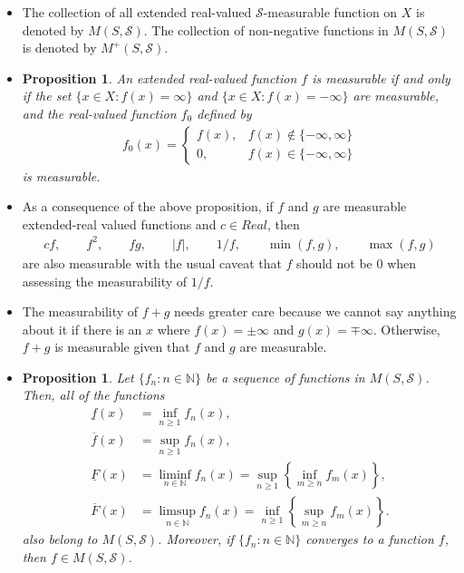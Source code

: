 \documentclass[10pt]{article}
\newtheorem{proposition}[lemma]{Proposition}
\newcommand{\mcal}[1]{\mathcal{#1}}
\begin{document}
\begin{itemize}
  \item The collection of all extended real-valued $\mcal{S}$-measurable function on $X$ is denoted by $M(S,\mcal{S})$. The collection of non-negative functions in $M(S, \mcal{S})$ is denoted by $M^+(S,\mcal{S})$.
  
  \item \begin{proposition}
    An extended real-valued function $f$ is measurable if and only if the set $\{ x \in X : f(x) = \infty\}$ and $\{ x \in X : f(x) = -\infty\}$ are measurable, and the real-valued function $f_0$ defined by
    \begin{align*}
      f_0(x) = \begin{cases}
        f(x), & f(x) \not\in \{-\infty,\infty\} \\
        0, & f(x) \in \{-\infty,\infty\}
      \end{cases}
    \end{align*}
    is measurable.
  \end{proposition}

  \item As a consequence of the above proposition, if $f$ and $g$ are measurable extended-real valued functions and $c \in Real$, then
  \begin{align*}
    cf, \qquad f^2, \qquad fg, \qquad |f|, \qquad 1/f, \qquad \min(f,g), \qquad \max(f,g)
  \end{align*}
  are also measurable with the usual caveat that $f$ should not be $0$ when assessing the measurability of $1/f$.

  \item The measurability of $f+g$ needs greater care because we cannot say anything about it if there is an $x$ where $f(x) = \pm\infty$ and $g(x) = \mp\infty$. Otherwise, $f+g$ is measurable given that $f$ and $g$ are measurable.
  
  \item \begin{proposition}
    Let $\{ f_n : n \in \mathbb{N} \}$ be a sequence of functions in $M(S,\mcal{S})$. Then, all of the functions
    \begin{align*}
      \underline{f}(x) &= \inf_{n \geq 1} f_n(x),\\
      \overline{f}(x) &= \sup_{n \geq 1} f_n(x), \\
      \underline{F}(x) &= \liminf_{n \in \mathbb{N}} f_n(x) = \sup_{n \geq 1} \left\{ \inf_{m \geq n} f_m(x) \right\}, \\
      \overline{F}(x) &= \limsup_{n \in \mathbb{N}} f_n(x) = \inf_{n \geq 1} \left\{ \sup_{m \geq n} f_m(x) \right\}.
    \end{align*}
    also belong to $M(S,\mcal{S})$. Moreover, if $\{ f_n : n \in \mathbb{N} \}$ converges to a function $f$, then $f \in M(S,\mcal{S})$.
  \end{proposition}


\end{itemize}
\end{document}
